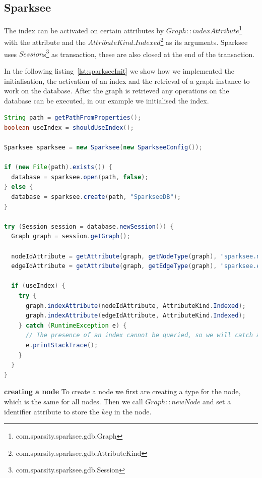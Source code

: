 \subsection{Sparksee}
The index can be activated on certain attributes by $ Graph::indexAttribute $\footnote{com.sparsity.sparksee.gdb.Graph} with the attribute and the $ AttributeKind.Indexed $\footnote{com.sparsity.sparksee.gdb.AttributeKind} as its arguments.
Sparksee uses $ Session $s\footnote{com.sparsity.sparksee.gdb.Session} as transaction,
these are also closed at the end of the transaction.

In the following listing~\ref{lst:sparkseeInit} we show how we implemented the initialisation, the activation of an index and the retrieval of a graph instance to work on the database.
After the graph is retrieved any operations on the database can be executed,
in our example we initialised the index.

\begin{lstlisting}[language=Java,label={lst:sparkseeInit},caption={Implementation of the initialisation and starting of a session.}]
String path = getPathFromProperties();
boolean useIndex = shouldUseIndex();

Sparksee sparksee = new Sparksee(new SparkseeConfig());

if (new File(path).exists()) {
  database = sparksee.open(path, false);
} else {
  database = sparksee.create(path, "SparkseeDB");
}

try (Session session = database.newSession()) {
  Graph graph = session.getGraph();

  nodeIdAttribute = getAttribute(graph, getNodeType(graph), "sparksee.nodeId");
  edgeIdAttribute = getAttribute(graph, getEdgeType(graph), "sparksee.edgeId");

  if (useIndex) {
    try {
      graph.indexAttribute(nodeIdAttribute, AttributeKind.Indexed);
      graph.indexAttribute(edgeIdAttribute, AttributeKind.Indexed);
    } catch (RuntimeException e) {
      // The presence of an index cannot be queried, so we will catch and ignore the exception thrown when an index already exists.
      e.printStackTrace();
    }
  }
}
\end{lstlisting}

\textbf{creating a node} \newline
To create a node we first are creating a type for the node,
which is the same for all nodes.
Then we call $ Graph::newNode $ and set a identifier attribute to store the $ key $ in the node.

